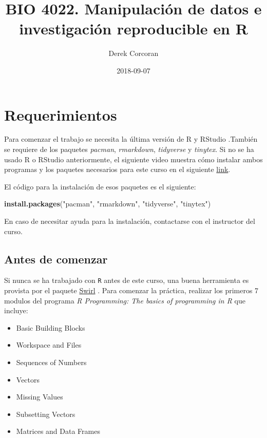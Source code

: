 \documentclass[]{book}
\title{BIO 4022. Manipulación de datos e investigación reproducible en R}
\author{Derek Corcoran}
\date{2018-09-07}
\newenvironment{Shaded}{\begin{snugshade}}{\end{snugshade}}
\newcommand{\KeywordTok}[1]{\textcolor[rgb]{0.13,0.29,0.53}{\textbf{#1}}}
\newcommand{\NormalTok}[1]{#1}
\newcommand{\StringTok}[1]{\textcolor[rgb]{0.31,0.60,0.02}{#1}}
\providecommand{\tightlist}{%
  \setlength{\itemsep}{0pt}\setlength{\parskip}{0pt}}
\begin{document}
\maketitle

{
\setcounter{tocdepth}{1}
\tableofcontents
}
\hypertarget{requerimientos}{%
\chapter*{Requerimientos}\label{requerimientos}}

Para comenzar el trabajo se necesita la última versión de R y RStudio
\citep{R-base}.También se requiere de los paquetes \emph{pacman},
\emph{rmarkdown}, \emph{tidyverse} y \emph{tinytex}. Si no se ha usado R
o RStudio anteriormente, el siguiente video muestra cómo instalar ambos
programas y los paquetes necesarios para este curso en el siguiente
\href{https://youtu.be/RtkCAKXsVbw}{link}.

El código para la instalación de esos paquetes es el siguiente:

\begin{Shaded}
\begin{Highlighting}[]
\KeywordTok{install.packages}\NormalTok{(}\StringTok{"pacman"}\NormalTok{, }\StringTok{"rmarkdown"}\NormalTok{, }\StringTok{"tidyverse"}\NormalTok{, }\StringTok{"tinytex"}\NormalTok{)}
\end{Highlighting}
\end{Shaded}

En caso de necesitar ayuda para la instalación, contactarse con el
instructor del curso.

\hypertarget{antes-de-comenzar}{%
\section{Antes de comenzar}\label{antes-de-comenzar}}

Si nunca se ha trabajado con \texttt{R} antes de este curso, una buena
herramienta es provista por el paquete
\href{http://swirlstats.com/students.html}{Swirl} \citep{Kross2017}.
Para comenzar la práctica, realizar los primeros 7 modulos del programa
\emph{R Programming: The basics of programming in R} que incluye:

\begin{itemize}
\tightlist
\item
  Basic Building Blocks
\item
  Workspace and Files
\item
  Sequences of Numbers
\item
  Vectors
\item
  Missing Values
\item
  Subsetting Vectors
\item
  Matrices and Data Frames
\end{itemize}
\end{document}

